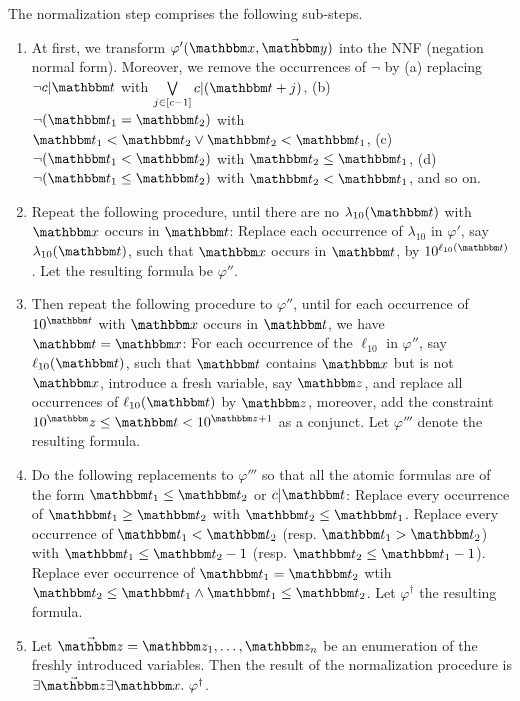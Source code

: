 The normalization step comprises the following sub-steps.
\begin{enumerate}
\item At first, we transform $\varphi'(\ivarx,\vec{\ivary})$ into the NNF (negation normal form). Moreover, we remove the occurrences of $\neg$ by (a) replacing $\neg c | \iterm$ with $\bigvee \limits_{j \in [c-1]} c | (\iterm+j)$, (b)  $\neg (\iterm_1 = \iterm_2)$ with $\iterm_1 < \iterm_2 \vee \iterm_2 < \iterm_1$, (c) $\neg (\iterm_1 < \iterm_2)$ with $\iterm_2 \le \iterm_1$, (d) $\neg (\iterm_1 \le \iterm_2)$ with $\iterm_2 < \iterm_1$, and so on.
%
\item Repeat the following procedure, until there are no $\lambda_{10}(\iterm)$ with $\ivarx$ occurs in $\iterm$: Replace each occurrence of $\lambda_{10}$ in $\varphi'$, say $\lambda_{10}(\iterm)$, such that $\ivarx$ occurs in $\iterm$, by $10^{\ell_{10}(\iterm)}$. Let the resulting formula be $\varphi''$.
%
\item Then repeat the following procedure to $\varphi''$, until for each occurrence of $10^{\iterm}$ with $\ivarx$ occurs in $\iterm$, we have $\iterm = \ivarx$: For each occurrence of the $\ell_{10}$ in $\varphi''$, say $\ell_{10}(\iterm)$, such that $\iterm$ contains $\ivarx$ but is not $\ivarx$, introduce a fresh variable, say $\ivarz$, 
and replace all occurrences of $\ell_{10}(\iterm)$ by $\ivarz$, moreover, add the constraint $10^\ivarz \le \iterm < 10^{\ivarz + 1}$ as a conjunct. Let $\varphi'''$ denote the resulting formula.  
%
\item Do the following replacements to $\varphi'''$ so that all the atomic formulas are of the form $\iterm_1 \le \iterm_2$ or $c | \iterm$: Replace every occurrence of $\iterm_1 \ge \iterm_2$ with $\iterm_2 \le \iterm_1$. Replace every occurrence of $\iterm_1 < \iterm_2$ (resp. $\iterm_1 > \iterm_2$) with $\iterm_1 \le \iterm_2 - 1$ (resp. $\iterm_2 \le \iterm_1-1$). Replace ever occurrence of $\iterm_1 = \iterm_2$ wtih $\iterm_2 \le \iterm_1 \wedge \iterm_1 \le \iterm_2$. Let $\varphi^\dag$ the resulting formula. 
%
\item Let $\vec{\ivarz} = \ivarz_1,\ldots, \ivarz_n$ be an enumeration of the freshly introduced variables. Then the result of the normalization procedure is 
$\exists \vec{\ivarz}\exists \ivarx.\ \varphi^\dag$.
\end{enumerate}

